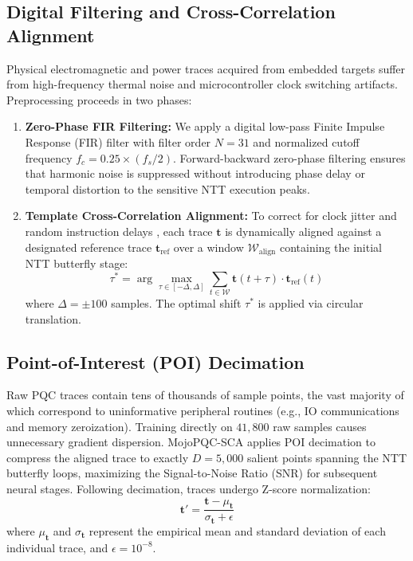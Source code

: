 \documentclass[letterpaper]{article}
\begin{document}
\subsection{Digital Filtering and Cross-Correlation Alignment}
Physical electromagnetic and power traces acquired from embedded targets suffer from high-frequency thermal noise and microcontroller clock switching artifacts. Preprocessing proceeds in two phases:
\begin{enumerate}
    \item \textbf{Zero-Phase FIR Filtering:} We apply a digital low-pass Finite Impulse Response (FIR) filter with filter order $N = 31$ and normalized cutoff frequency $f_c = 0.25 \times (f_s / 2)$. Forward-backward zero-phase filtering ensures that harmonic noise is suppressed without introducing phase delay or temporal distortion to the sensitive NTT execution peaks.
    \item \textbf{Template Cross-Correlation Alignment:} To correct for clock jitter and random instruction delays \cite{cagli2017convolutional,kim2019make}, each trace $\mathbf{t}$ is dynamically aligned against a designated reference trace $\mathbf{t}_{\text{ref}}$ over a window $\mathcal{W}_{\text{align}}$ containing the initial NTT butterfly stage:
    \begin{equation}
    \tau^* = \arg\max_{\tau \in [-\Delta, \Delta]} \sum_{t \in \mathcal{W}} \mathbf{t}(t + \tau) \cdot \mathbf{t}_{\text{ref}}(t)
    \label{eq:cross_corr}
    \end{equation}
    where $\Delta = \pm 100$ samples. The optimal shift $\tau^*$ is applied via circular translation.
\end{enumerate}

\subsection{Point-of-Interest (POI) Decimation}
Raw PQC traces contain tens of thousands of sample points, the vast majority of which correspond to uninformative peripheral routines (e.g., IO communications and memory zeroization). Training directly on $41,800$ raw samples causes unnecessary gradient dispersion. MojoPQC-SCA applies POI decimation to compress the aligned trace to exactly $D = 5,000$ salient points spanning the NTT butterfly loops, maximizing the Signal-to-Noise Ratio (SNR) for subsequent neural stages. Following decimation, traces undergo Z-score normalization:
\begin{equation}
\mathbf{t}' = \frac{\mathbf{t} - \mu_{\mathbf{t}}}{\sigma_{\mathbf{t}} + \epsilon}
\label{eq:zscore}
\end{equation}
where $\mu_{\mathbf{t}}$ and $\sigma_{\mathbf{t}}$ represent the empirical mean and standard deviation of each individual trace, and $\epsilon = 10^{-8}$.
\end{document}
